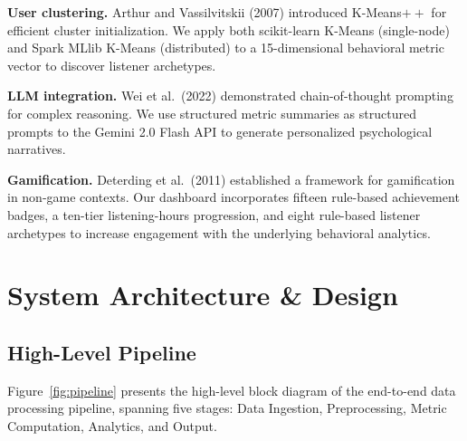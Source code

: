 \documentclass[conference]{IEEEtran}
\begin{document}
\textbf{User clustering.} Arthur and Vassilvitskii (2007) \cite{arthur2007} introduced K-Means$++$ for efficient cluster initialization. We apply both scikit-learn K-Means (single-node) and Spark MLlib K-Means (distributed) to a 15-dimensional behavioral metric vector to discover listener archetypes.

\textbf{LLM integration.} Wei et al.\ (2022) \cite{wei2022} demonstrated chain-of-thought prompting for complex reasoning. We use structured metric summaries as structured prompts to the Gemini 2.0 Flash API to generate personalized psychological narratives.

\textbf{Gamification.} Deterding et al.\ (2011) \cite{deterding2011} established a framework for gamification in non-game contexts. Our dashboard incorporates fifteen rule-based achievement badges, a ten-tier listening-hours progression, and eight rule-based listener archetypes to increase engagement with the underlying behavioral analytics.

\section{System Architecture \& Design}

\subsection{High-Level Pipeline}

Figure~\ref{fig:pipeline} presents the high-level block diagram of the end-to-end data processing pipeline, spanning five stages: Data Ingestion, Preprocessing, Metric Computation, Analytics, and Output.
\end{document}
